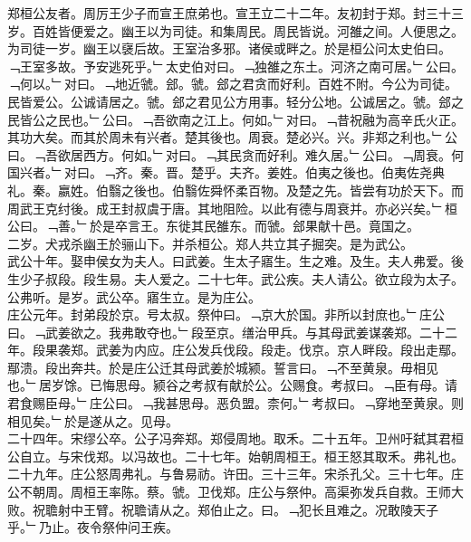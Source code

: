 \documentclass{zhvt-classic}
\begin{document}

\hspace*{2em}郑桓公友者。周厉王少子而宣王庶弟也。宣王立二十二年。友初封于郑。封三十三岁。百姓皆便爱之。幽王以为司徒。和集周民。周民皆说。河雒之间。人便思之。为司徒一岁。幽王以襃后故。王室治多邪。诸侯或畔之。於是桓公问太史伯曰。﹁王室多故。予安逃死乎。﹂太史伯对曰。﹁独雒之东土。河济之南可居。﹂公曰。﹁何以。﹂对曰。﹁地近虢。郐。虢。郐之君贪而好利。百姓不附。今公为司徒。民皆爱公。公诚请居之。虢。郐之君见公方用事。轻分公地。公诚居之。虢。郐之民皆公之民也。﹂公曰。﹁吾欲南之江上。何如。﹂对曰。﹁昔祝融为高辛氏火正。其功大矣。而其於周未有兴者。楚其後也。周衰。楚必兴。兴。非郑之利也。﹂公曰。﹁吾欲居西方。何如。﹂对曰。﹁其民贪而好利。难久居。﹂公曰。﹁周衰。何国兴者。﹂对曰。﹁齐。秦。晋。楚乎。夫齐。姜姓。伯夷之後也。伯夷佐尧典礼。秦。嬴姓。伯翳之後也。伯翳佐舜怀柔百物。及楚之先。皆尝有功於天下。而周武王克纣後。成王封叔虞于唐。其地阻险。以此有德与周衰并。亦必兴矣。﹂桓公曰。﹁善。﹂於是卒言王。东徙其民雒东。而虢。郐果献十邑。竟国之。\\
\hspace*{2em}二岁。犬戎杀幽王於骊山下。并杀桓公。郑人共立其子掘突。是为武公。\\
\hspace*{2em}武公十年。娶申侯女为夫人。曰武姜。生太子寤生。生之难。及生。夫人弗爱。後生少子叔段。段生易。夫人爱之。二十七年。武公疾。夫人请公。欲立段为太子。公弗听。是岁。武公卒。寤生立。是为庄公。\\
\hspace*{2em}庄公元年。封弟段於京。号太叔。祭仲曰。﹁京大於国。非所以封庶也。﹂庄公曰。﹁武姜欲之。我弗敢夺也。﹂段至京。缮治甲兵。与其母武姜谋袭郑。二十二年。段果袭郑。武姜为内应。庄公发兵伐段。段走。伐京。京人畔段。段出走鄢。鄢溃。段出奔共。於是庄公迁其母武姜於城颍。誓言曰。﹁不至黄泉。毋相见也。﹂居岁馀。已悔思母。颍谷之考叔有献於公。公赐食。考叔曰。﹁臣有母。请君食赐臣母。﹂庄公曰。﹁我甚思母。恶负盟。柰何。﹂考叔曰。﹁穿地至黄泉。则相见矣。﹂於是遂从之。见母。\\
\hspace*{2em}二十四年。宋缪公卒。公子冯奔郑。郑侵周地。取禾。二十五年。卫州吁弑其君桓公自立。与宋伐郑。以冯故也。二十七年。始朝周桓王。桓王怒其取禾。弗礼也。二十九年。庄公怒周弗礼。与鲁易祊。许田。三十三年。宋杀孔父。三十七年。庄公不朝周。周桓王率陈。蔡。虢。卫伐郑。庄公与祭仲。高渠弥发兵自救。王师大败。祝聸射中王臂。祝聸请从之。郑伯止之。曰。﹁犯长且难之。况敢陵天子乎。﹂乃止。夜令祭仲问王疾。\\
\end{document}
